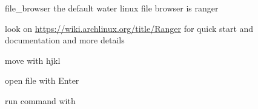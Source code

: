 \begin{section}{file_browser}
	the default water linux file browser is ranger

	look on \url{https://wiki.archlinux.org/title/Ranger} for quick start and documentation and more details

	move with hjkl

	open file with Enter

	run command with


\end{section}
